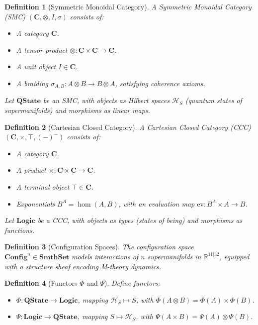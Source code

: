 \documentclass{article}
\newtheorem{definition}{Definition}[section]
\begin{document}
\begin{definition}[Symmetric Monoidal Category]
A Symmetric Monoidal Category (SMC) \((\mathbf{C}, \otimes, I, \sigma)\) consists of:
\begin{itemize}
    \item A category \(\mathbf{C}\).
    \item A tensor product \(\otimes: \mathbf{C} \times \mathbf{C} \to \mathbf{C}\).
    \item A unit object \(I \in \mathbf{C}\).
    \item A braiding \(\sigma_{A,B}: A \otimes B \to B \otimes A\), satisfying coherence axioms.
\end{itemize}
Let \(\mathbf{QState}\) be an SMC, with objects as Hilbert spaces \(\mathcal{H}_S\) (quantum states of supermanifolds) and morphisms as linear maps.
\end{definition}

\begin{definition}[Cartesian Closed Category]
A Cartesian Closed Category (CCC) \((\mathbf{C}, \times, \top, (-)^-)\) consists of:
\begin{itemize}
    \item A category \(\mathbf{C}\).
    \item A product \(\times: \mathbf{C} \times \mathbf{C} \to \mathbf{C}\).
    \item A terminal object \(\top \in \mathbf{C}\).
    \item Exponentials \(B^A = \hom(A, B)\), with an evaluation map \(\text{ev}: B^A \times A \to B\).
\end{itemize}
Let \(\mathbf{Logic}\) be a CCC, with objects as types (states of being) and morphisms as functions.
\end{definition}

\begin{definition}[Configuration Spaces]
The configuration space \(\mathbf{Config}^n \in \mathbf{SmthSet}\) models interactions of \(n\) supermanifolds in \(\mathbb{R}^{11|32}\), equipped with a structure sheaf encoding M-theory dynamics.
\end{definition}

\begin{definition}[Functors \(\Phi\) and \(\Psi\)]
Define functors:
\begin{itemize}
    \item \(\Phi: \mathbf{QState} \to \mathbf{Logic}\), mapping \(\mathcal{H}_S \mapsto S\), with \(\Phi(A \otimes B) = \Phi(A) \times \Phi(B)\).
    \item \(\Psi: \mathbf{Logic} \to \mathbf{QState}\), mapping \(S \mapsto \mathcal{H}_S\), with \(\Psi(A \times B) = \Psi(A) \otimes \Psi(B)\).
\end{itemize}
\end{definition}
\end{document}
